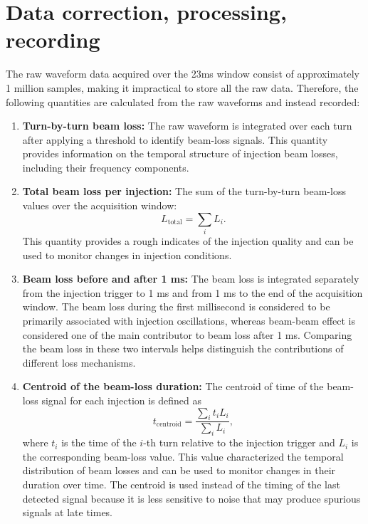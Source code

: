 \section{Data correction, processing, recording}

The raw waveform data acquired over the 23ms window consist of approximately 1 million samples, making it impractical to store all the raw data. Therefore, the following quantities are calculated from the raw waveforms and instead recorded: \\

\begin{enumerate}
    \item \textbf{Turn-by-turn beam loss:}
    The raw waveform is integrated over each turn after applying a threshold to identify beam-loss signals. This quantity provides information on the temporal  structure of injection beam losses, including their frequency components.

    \item \textbf{Total beam loss per injection:}
    The sum of the turn-by-turn beam-loss values over the acquisition window:
    \[
        L_{\mathrm{total}} = \sum_i L_i.
    \]
    This quantity provides a rough indicates of the injection quality and can be used to monitor changes in injection conditions. 

    \item \textbf{Beam loss before and after 1 ms:}
    The beam loss is integrated separately from the injection trigger to 1 ms and from 1 ms to the end of the acquisition window. The beam loss during the first millisecond is considered to be primarily associated with injection oscillations, whereas beam-beam effect is considered one of the main contributor to beam loss after 1 ms. Comparing the beam loss in these two intervals helps distinguish the contributions of different loss mechanisms. 

    \item \textbf{Centroid of the beam-loss duration:}
    The centroid of time of the beam-loss signal for each injection is defined as
    \[
        t_{\mathrm{centroid}}
        = \frac{\sum_i t_i L_i}{\sum_i L_i},
    \]
    where \(t_i\) is the time of the \(i\)-th turn relative to the injection trigger and \(L_i\) is the corresponding beam-loss value.    
    This value characterized the temporal distribution of beam losses and can be used to monitor changes in their duration over time. The centroid is used instead of the timing of the last detected signal because it is less sensitive to noise that may produce spurious signals at late times.
    
\end{enumerate}

